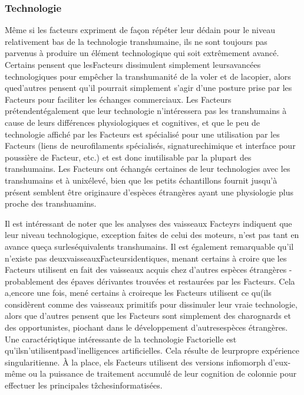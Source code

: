 \subsubsection{Technologie} 

Même si les facteurs expriment de façon répéter leur dédain pour le niveau relativement bas de la technologie transhumaine, ils ne sont toujours pas parvenus à produire un élément technologique qui soit extrêmement avancé. Certains pensent que lesFacteurs dissimulent simplement leursavancées technologiques pour empêcher la transhumanité de la voler et de lacopier, alors qued'autres pensent qu'il pourrait simplement s'agir d'une posture prise par les Facteurs pour faciliter les échanges commerciaux. Les Facteurs prétendentégalement que leur technologie n'intéressera pas les transhumains à cause de leurs différences physiologiques et cognitives, et que le peu de technologie affiché par les Facteurs est spécialisé pour une utilisation par les Facteurs (liens de neurofilaments spécialisés, signaturechimique et interface pour poussière de Facteur, etc.) et est donc inutilisable par la plupart des transhumains. Les Facteurs ont échangés certaines de leur technologies avec les transhumains et à unixélevé, bien que les petits échantillons fournit jusqu'à présent semblent être originaure d'espèces étrangères ayant une physiologie plus proche des transhuamins. 

Il est intéressant de noter que les analyses des vaisseaux Facteyrs indiquent que leur niveau technologique, exception faites de celui des moteurs, n'est pas tant en avance queça surleséquivalents transhumains. Il est également remarquable qu'il n'existe pas deuxvaisseauxFacteursidentiques, menant certains à croire que les Facteurs utilisent en fait des vaisseaux acquis chez d'autres espèces étrangères - probablement des épaves dérivantes trouvées et restaurées par les Facteurs. Cela a,encore une fois, mené certains à croireque les Facteurs utilisent ce qu(ils considèrent comme des vaisseaux primitifs pour dissimuler leur vraie technologie, alors que d'autres pensent que les Facteurs sont simplement des charognards et des opportunistes, piochant dans le développement d'autresespèces étrangères. Une caractériqtique intéressante de la technologie Factorielle est qu'ilsn'utilisentpasd'inelligences artificielles. Cela résulte de leurpropre expérience singularitienne. À la place, els Facteurs utilisent des versions infiomorph d'eux-même ou la puissance de traitement accumulé de leur cognition de colonnie pour effectuer les principales tẑchesinformatisées. 

